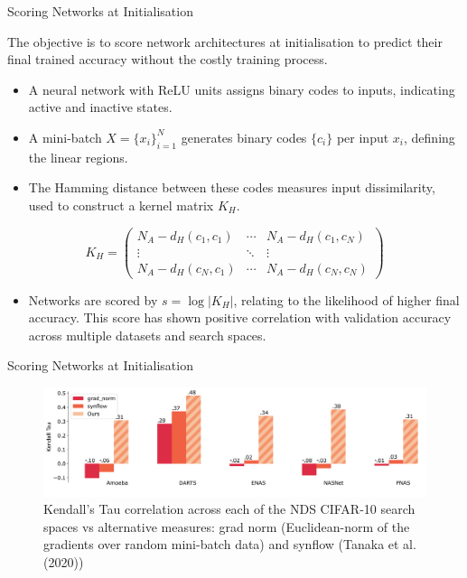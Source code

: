 \documentclass{beamer}
\begin{document}
\begin{frame}{Scoring Networks at Initialisation}
    \begin{block}{}
        The objective is to score network architectures at initialisation to predict their final trained accuracy without the costly training process.
        \begin{itemize}
            \item A neural network with ReLU units assigns binary codes to inputs, indicating active and inactive states.
            \item A mini-batch \( X = \{x_i\}_{i=1}^N \) generates binary codes \( \{c_i\} \) per input \( x_i \), defining the linear regions.
            \item The Hamming distance between these codes measures input dissimilarity, used to construct a kernel matrix \( K_H \).
        \end{itemize}
        \begin{equation}
            K_H = \begin{pmatrix}
            N_A - d_H(c_1, c_1) & \cdots & N_A - d_H(c_1, c_N) \\
            \vdots & \ddots & \vdots \\
            N_A - d_H(c_N, c_1) & \cdots & N_A - d_H(c_N, c_N)
            \end{pmatrix}
        \end{equation}
        \begin{itemize}
            \item Networks are scored by \( s = \log |K_H| \), relating to the likelihood of higher final accuracy. This score has shown positive correlation with validation accuracy across multiple datasets and search spaces.
        \end{itemize}
    \end{block}
\end{frame}

\begin{frame}{Scoring Networks at Initialisation}
    \begin{block}{}
        \begin{figure}{}
            \centering
            \includegraphics[scale=0.17]{images/figure4.png}
            \caption{Kendall’s Tau correlation across each of the NDS CIFAR-10 search spaces vs alternative measures: grad norm (Euclidean-norm of the gradients over random mini-batch data) and synflow (Tanaka et al. (2020))}
            \label{fig:enter-label}
        \end{figure}
    \end{block}
\end{frame}
\end{document}
